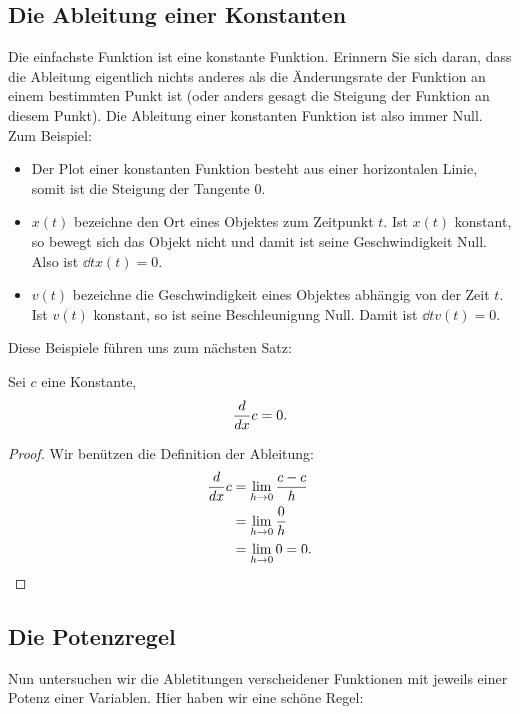 \subsection*{Die Ableitung einer Konstanten}

Die einfachste Funktion ist eine konstante Funktion. Erinnern Sie sich daran, dass die Ableitung eigentlich nichts anderes als die Änderungsrate der Funktion an einem bestimmten Punkt ist (oder anders gesagt die Steigung der Funktion an diesem Punkt). Die Ableitung einer konstanten Funktion ist also immer Null. Zum Beispiel:
\begin{itemize}
\item Der Plot einer konstanten Funktion besteht aus einer horizontalen Linie, somit ist die Steigung der Tangente 0.
\item $x(t)$ bezeichne den Ort eines Objektes zum Zeitpunkt $t$. Ist $x(t)$ konstant, so bewegt sich das Objekt nicht und damit ist seine Geschwindigkeit Null. Also ist $\dd{t} x(t) = 0$.
\item $v(t)$ bezeichne die Geschwindigkeit eines Objektes abhängig von der Zeit $t$. Ist $v(t)$ konstant, so ist seine Beschleunigung Null. Damit ist $\dd{t} v(t) = 0$.
\end{itemize}
Diese Beispiele führen uns zum nächsten Satz:


\begin{mainTheorem}
Sei $c$ eine Konstante,
\[
\frac{d}{dx} c = 0.
\]
\end{mainTheorem}

\begin{proof}
Wir benützen die Definition der Ableitung:
\begin{align*}
\frac{d}{dx} c &= \lim_{h\to 0}\frac{c-c}{h}\\
&= \lim_{h\to 0} \frac{0}{h}\\
&= \lim_{h\to 0} 0 = 0.
\end{align*}
\end{proof}


\subsection*{Die Potenzregel}

Nun untersuchen wir die Abletitungen verscheidener Funktionen mit jeweils einer Potenz einer Variablen.
 Hier haben wir eine schöne Regel:

